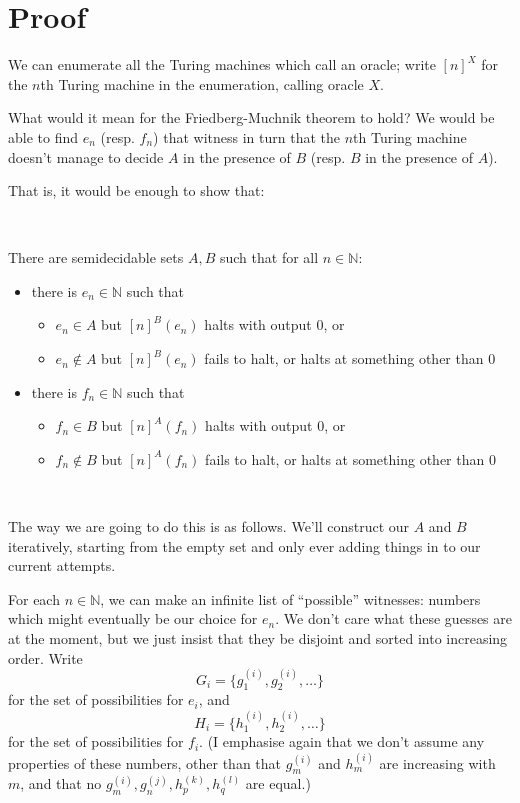\documentclass[11pt]{amsart}
\begin{document}
\section{Proof}

We can enumerate all the Turing machines which call an oracle; write $[ n ]^X$ for the $n$th Turing machine in the enumeration, calling oracle $X$.

What would it mean for the Friedberg-Muchnik theorem to hold?
We would be able to find $e_n$ (resp. $f_n$) that witness in turn that the $n$th Turing machine doesn't manage to decide $A$ in the presence of $B$ (resp. $B$ in the presence of $A$).

That is, it would be enough to show that:

\

\begin{thm} There are semidecidable sets $A, B$ such that for all $n \in \mathbb{N}$:
\begin{itemize}
\item there is $e_n \in \mathbb{N}$ such that \begin{itemize} \item $e_n \in A$ but $[n]^B(e_n)$ halts with output $0$, or \item $e_n \not \in A$ but $[n]^B(e_n)$ fails to halt, or halts at something other than $0$ \end{itemize}
\item there is $f_n \in \mathbb{N}$ such that \begin{itemize} \item $f_n \in B$ but $[n]^A(f_n)$ halts with output $0$, or \item $f_n \not \in B$ but $[n]^A(f_n)$ fails to halt, or halts at something other than $0$ \end{itemize}
\end{itemize}
\end{thm}

\

The way we are going to do this is as follows.
We'll construct our $A$ and $B$ iteratively, starting from the empty set and only ever adding things in to our current attempts.

For each $n \in \mathbb{N}$, we can make an infinite list of ``possible'' witnesses: numbers which might eventually be our choice for $e_n$.
We don't care what these guesses are at the moment, but we just insist that they be disjoint and sorted into increasing order.
Write $$G_i = \{g^{(i)}_1, g^{(i)}_2, \dots \}$$ for the set of possibilities for $e_i$, and $$H_i = \{ h^{(i)}_1, h^{(i)}_2, \dots \}$$ for the set of possibilities for $f_i$.
(I emphasise again that we don't assume any properties of these numbers, other than that $g^{(i)}_m$ and $h^{(i)}_m$ are increasing with $m$, and that no $g^{(i)}_m, g^{(j)}_n, h^{(k)}_p, h^{(l)}_q$ are equal.)
\end{document}

